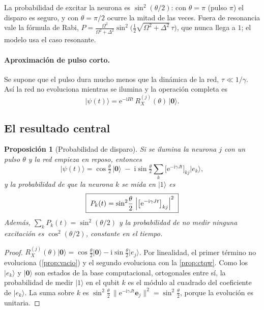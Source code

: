 \documentclass[11pt,a4paper]{article}
\renewcommand{\ket}[1]{\lvert #1\rangle}
\newcommand{\vac}{\ket{\mathbf{0}}}
\newcommand{\e}{\mathrm{e}}
\newcommand{\ii}{\mathrm{i}}
\newcommand{\RX}{R_X}
\theoremstyle{plain}
\newtheorem{proposicion}{Proposición}[section]
\theoremstyle{definition}
\theoremstyle{remark}
\begin{document}
La probabilidad de excitar la neurona es $\sin^2(\theta/2)$: con $\theta=\pi$ (pulso $\pi$) el disparo es seguro, y con $\theta=\pi/2$ ocurre la mitad de las veces. Fuera de resonancia vale la fórmula de Rabi, $P=\frac{\Omega^2}{\Omega^2+\Delta^2}\sin^2\!\bigl(\tfrac12\sqrt{\Omega^2+\Delta^2}\,\tau\bigr)$, que nunca llega a $1$; el modelo usa el caso resonante.

\paragraph{Aproximación de pulso corto.} Se supone que el pulso dura mucho menos que la dinámica de la red, $\tau\ll1/\gamma$. Así la red no evoluciona mientras se ilumina y la operación completa es
\begin{equation}
\ket{\psi(t)} = \e^{-\ii Ht}\,\RX^{(j)}(\theta)\,\vac .
\end{equation}

\subsection{El resultado central}

\begin{proposicion}[Probabilidad de disparo]\label{prop:central}
Si se ilumina la neurona $j$ con un pulso $\theta$ y la red empieza en reposo, entonces
\begin{equation}
\ket{\psi(t)} = \cos\tfrac\theta2\,\vac \;-\;\ii\sin\tfrac\theta2\sum_k\bigl[\e^{-\ii\gamma Jt}\bigr]_{kj}\ket{e_k},
\end{equation}
y la probabilidad de que la neurona $k$ se mida en $\ket1$ es
\begin{equation}
\boxed{\;P_k(t) = \sin^2\!\frac\theta2\;\Bigl|\bigl[\e^{-\ii\gamma Jt}\bigr]_{kj}\Bigr|^2\;}
\label{eq:central}
\end{equation}
Además, $\sum_kP_k(t)=\sin^2(\theta/2)$ y la probabilidad de no medir ninguna excitación es $\cos^2(\theta/2)$, constante en el tiempo.
\end{proposicion}

\begin{proof}
$\RX^{(j)}(\theta)\vac = \cos\frac\theta2\vac - \ii\sin\frac\theta2\ket{e_j}$. Por linealidad, el primer término no evoluciona (\cref{prop:vacio}) y el segundo evoluciona con la \cref{prop:ctqw}. Como los $\ket{e_k}$ y $\vac$ son estados de la base computacional, ortogonales entre sí, la probabilidad de medir $\ket1$ en el qubit $k$ es el módulo al cuadrado del coeficiente de $\ket{e_k}$. La suma sobre $k$ es $\sin^2\frac\theta2\,\lVert\e^{-\ii\gamma Jt}\bm e_j\rVert^2=\sin^2\frac\theta2$, porque la evolución es unitaria.
\end{proof}
\end{document}
